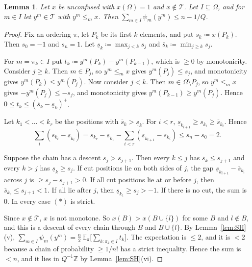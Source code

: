 \documentclass[11pt]{article}
\newtheorem{lemma}[theorem]{Lemma}
\theoremstyle{definition}
\theoremstyle{remark}
\newcommand{\T}{\mathcal T}
\begin{document}
\begin{lemma}\label{lem:CH}
Let $x$ be unconfused with $x(\Omega)=1$ and $x\notin\T$. Let $I\subseteq\Omega$, and for $m\in I$ let $y^m\in\T$ with $y^m\le_mx$. Then $\sum_{m\in I}\psi_m(y^m)\le n-1/Q$.
\end{lemma}
\begin{proof}
Fix an ordering $\pi$, let $P_k$ be its first $k$ elements, and put $s_k\coloneqq x(P_k)$. Then $s_0=-1$ and $s_n=1$. Let $\underline s_k\coloneqq\max_{j<k}s_j$ and $\overline s_k\coloneqq\min_{j\ge k}s_j$.

For $m=\pi_k\in I$ put $t_k\coloneqq y^m(P_k)-y^m(P_{k-1})$, which is $\ge0$ by monotonicity. Consider $j\ge k$. Then $m\in P_j$, so $y^m\le_mx$ gives $y^m(P_j)\le s_j$, and monotonicity gives $y^m(P_k)\le y^m(P_j)$. Now consider $j<k$. Then $m\in\Omega\setminus P_j$, so $y^m\le_mx$ gives $-y^m(P_j)\le-s_j$, and monotonicity gives $y^m(P_{k-1})\ge y^m(P_j)$. Hence $0\le t_k\le(\overline s_k-\underline s_k)^+$.

Let $k_1<\dots<k_r$ be the positions with $\overline s_k>\underline s_k$. For $i<r$, $\underline s_{k_{i+1}}\ge s_{k_i}\ge\overline s_{k_i}$. Hence
\[
\sum_{i}(\overline s_{k_i}-\underline s_{k_i})=\overline s_{k_r}-\underline s_{k_1}-\sum_{i<r}(\underline s_{k_{i+1}}-\overline s_{k_i})\le s_n-s_0=2.\tag{$\ast$}
\]

Suppose the chain has a descent $s_j>s_{j+1}$. Then every $k\le j$ has $\overline s_k\le s_{j+1}$ and every $k>j$ has $\underline s_k\ge s_j$. If cut positions lie on both sides of $j$, the gap $\underline s_{k_{i+1}}-\overline s_{k_i}$ across $j$ is $\ge s_j-s_{j+1}>0$. If all cut positions lie at or before $j$, then $\overline s_{k_r}\le s_{j+1}<1$. If all lie after $j$, then $\underline s_{k_1}\ge s_j>-1$. If there is no cut, the sum is $0$. In every case $(\ast)$ is strict.

Since $x\notin\T$, $x$ is not monotone. So $x(B)>x(B\cup\{l\})$ for some $B$ and $l\notin B$, and this is a descent of every chain through $B$ and $B\cup\{l\}$. By Lemma~\ref{lem:SH}(v), $\sum_{m\in I}\psi_m(y^m)=\tfrac n2\,\mathbb E_\pi\bigl[\sum_{k:\pi_k\in I}t_k\bigr]$. The expectation is $\le 2$, and it is $<2$ because a chain of probability $\ge1/n!$ has a strict inequality. Hence the sum is $<n$, and it lies in $Q^{-1}\mathbb Z$ by Lemma~\ref{lem:SH}(vi).
\end{proof}
\end{document}
